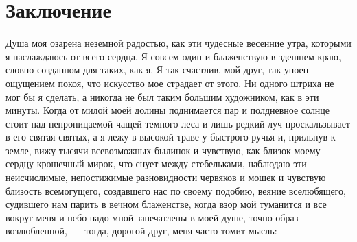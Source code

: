
\section{Заключение}
\label{sec:conclusion}
Душа моя озарена неземной радостью, как эти чудесные весенние утра, которыми я наслаждаюсь от всего сердца.
Я совсем один и блаженствую в здешнем краю, словно созданном для таких, как я.
Я так счастлив, мой друг, так упоен ощущением покоя, что искусство мое страдает от этого.
Ни одного штриха не мог бы я сделать, а никогда не был таким большим художником, как в эти минуты.
Когда от милой моей долины поднимается пар и полдневное солнце стоит над непроницаемой чащей темного леса и лишь редкий луч проскальзывает в его святая святых, а я лежу в высокой траве у быстрого ручья и, прильнув к земле, вижу тысячи всевозможных былинок и чувствую, как близок моему сердцу крошечный мирок, что снует между стебельками, наблюдаю эти неисчислимые, непостижимые разновидности червяков и мошек и чувствую близость всемогущего, создавшего нас по своему подобию, веяние вселюбящего, судившего нам парить в вечном блаженстве, когда взор мой туманится и все вокруг меня и небо надо мной запечатлены в моей душе, точно образ возлюбленной,~--- тогда, дорогой друг, меня часто томит мысль: 
